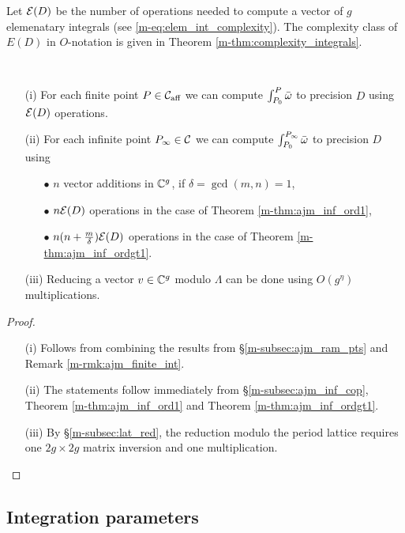 \documentclass[main.tex]{subfiles}
\begin{document}
  Let $\mathcal E(D)$ be the number of operations needed to compute a vector of $g$ elemenatary integrals  (see \eqref{m-eq:elem_int_complexity}). The complexity class of $E(D)$ in $O$-notation is given in
  Theorem \ref{m-thm:complexity_integrals}.
  
   \begin{thm} \
   \begin{itemize}
     \item[(i)] For each finite point $P \in \mathcal{C}_{\text{aff}}$ we can compute $\int_{P_0}^P \bar{\omega}$ to precision $D$ using 
      $\mathcal E(D)$ operations. 
     \item[(ii)] For each infinite point $P_{\infty} \in \mathcal{C}$ we can compute $\int_{P_0}^{P_{\infty}} \bar{\omega}$ to precision $D$ using
      \begin{itemize}
       \item[$\bullet$] $n$ vector additions in $\mathbb{C}^g$, if $\delta = \gcd(m,n) = 1$,
       \item[$\bullet$] $n \mathcal E(D)$ operations in the case of Theorem \ref{m-thm:ajm_inf_ord1},
       \item[$\bullet$] $n(n+\frac{m}\delta)\mathcal E(D)$ operations  in the case of Theorem \ref{m-thm:ajm_inf_ordgt1}.
      \end{itemize}
      \item[(iii)] Reducing a vector $v \in \mathbb{C}^g$ modulo $\Lambda$ can be done using $O(g^{\eta})$ multiplications.
    \end{itemize}
  \end{thm}
   \begin{proof}
    \begin{itemize}
     \item[(i)] Follows from combining the results from \S \ref{m-subsec:ajm_ram_pts} and Remark \ref{m-rmk:ajm_finite_int}.
     \item[(ii)] The statements follow immediately from \S \ref{m-subsec:ajm_inf_cop}, Theorem \ref{m-thm:ajm_inf_ord1} and Theorem \ref{m-thm:ajm_inf_ordgt1}.
     \item[(iii)] By \S \ref{m-subsec:lat_red}, the reduction modulo the period lattice requires one $2g \times 2g$ matrix inversion and one multiplication.
    \end{itemize}
   \end{proof}

   \subsection{Integration parameters}
\end{document}
